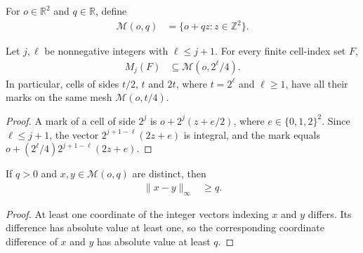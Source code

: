 \begin{definition}
    \label{def:area_law_affine_mesh}
    \leanok
    For $o\in\mathbb R^2$ and $q\in\mathbb R$, define
    \begin{align}
        \mathcal M(o,q) & =\{o+qz:z\in\mathbb Z^2\}.
    \end{align}
\end{definition}

\begin{lemma}
    \label{thm:area_law_belt_marks_quarter_mesh}
    \leanok
    Let $j,\ell$ be nonnegative integers with $\ell\le j+1$.
    For every finite cell-index set $F$,
    \begin{align}
        M_j(F) & \subseteq\mathcal M(o,2^\ell/4).
    \end{align}
    In particular, cells of sides $t/2$, $t$ and $2t$, where
    $t=2^\ell$ and $\ell\ge1$, have all their marks on the same
    mesh $\mathcal M(o,t/4)$.
\end{lemma}
\begin{proof}\leanok
    A mark of a cell of side $2^j$ is $o+2^j(z+e/2)$, where
    $e\in\{0,1,2\}^2$. Since $\ell\le j+1$, the vector
    $2^{j+1-\ell}(2z+e)$ is integral, and the mark equals
    $o+(2^\ell/4)2^{j+1-\ell}(2z+e)$.
\end{proof}

\begin{lemma}
    \label{thm:area_law_affine_mesh_point_separation}
    \leanok
    If $q>0$ and $x,y\in\mathcal M(o,q)$ are distinct, then
    \begin{align}
        \|x-y\|_\infty & \ge q.
    \end{align}
\end{lemma}
\begin{proof}\leanok
    At least one coordinate of the integer vectors indexing $x$ and
    $y$ differs. Its difference has absolute value at least one, so
    the corresponding coordinate difference of $x$ and $y$ has
    absolute value at least $q$.
\end{proof}

